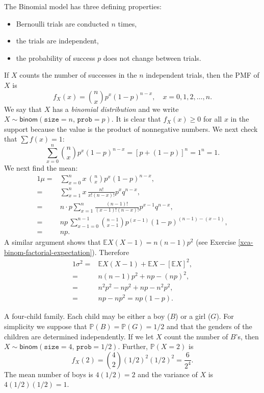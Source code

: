 \documentclass[captions=tableheading]{scrbook}
\begin{document}
The Binomial model has three defining properties:
\begin{itemize}
\item Bernoulli trials are conducted \(n\) times,
\item the trials are independent,
\item the probability of success \(p\) does not change between trials.
\end{itemize}
If \(X\) counts the number of successes in the \(n\) independent trials, then the PMF of \(X\) is 
\begin{equation}
f_{X}(x)={n \choose x}p^{x}(1-p)^{n-x},\quad x=0,1,2,\ldots,n.
\end{equation}
We say that \(X\) has a \emph{binomial distribution} and we write \(X\sim\mathsf{binom}(\mathtt{size}=n,\,\mathtt{prob}=p)\). It is clear that \(f_{X}(x)\geq0\) for all \(x\) in the support because the value is the product of nonnegative numbers. We next check that \(\sum f(x)=1\):
\[
\sum_{x=0}^{n}{n \choose x}p^{x}(1-p)^{n-x}=[p+(1-p)]^{n}=1^{n}=1.
\]
We next find the mean:
\begin{alignat*}{1}
\mu= & \sum_{x=0}^{n}x\,{n \choose x}p^{x}(1-p)^{n-x},\\
= & \sum_{x=1}^{n}x\,\frac{n!}{x!(n-x)!}p^{x}q^{n-x},\\
= & n\cdot p\sum_{x=1}^{n}\frac{(n-1)!}{(x-1)!(n-x)!}p^{x-1}q^{n-x},\\
= & np\,\sum_{x-1=0}^{n-1}{n-1 \choose x-1}p^{(x-1)}(1-p)^{(n-1)-(x-1)},\\
= & np.
\end{alignat*}
A similar argument shows that \(\mathbb{E} X(X-1)=n(n-1)p^{2}\) (see Exercise \ref{xca-binom-factorial-expectation}). Therefore
\begin{alignat*}{1}
\sigma^{2}= & \mathbb{E} X(X-1)+\mathbb{E} X-[\mathbb{E} X]^{2},\\
= & n(n-1)p^{2}+np-(np)^{2},\\
= & n^{2}p^{2}-np^{2}+np-n^{2}p^{2},\\
= & np-np^{2}=np(1-p).
\end{alignat*}

\begin{example}
A four-child family. Each child may be either a boy (\(B\)) or a girl (\(G\)). For simplicity we suppose that \(\mathbb{P}(B)=\mathbb{P}(G)=1/2\) and that the genders of the children are determined independently. If we let \(X\) count the number of \(B\)'s, then \(X\sim\mathsf{binom}(\mathtt{size}=4,\,\mathtt{prob}=1/2)\). Further, \(\mathbb{P}(X=2)\) is
\[
f_{X}(2)={4 \choose 2}(1/2)^{2}(1/2)^{2}=\frac{6}{2^{4}}.
\]
The mean number of boys is \(4(1/2)=2\) and the variance of \(X\) is \(4(1/2)(1/2)=1\).
\end{example}
\end{document}
